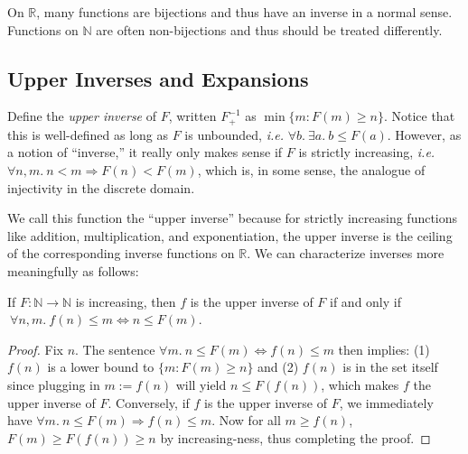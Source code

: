 On $\mathbb{R}$, many functions are bijections and thus have an inverse in a normal sense.  Functions on $\mathbb{N}$ are often non-bijections and thus should be treated differently.

\subsection{Upper Inverses and Expansions}
\begin{defn} \label{defn: inverse}
Define the \emph{upper inverse} of $F$, written $F^{-1}_{+}$ as $\min\{m : F(m)\ge n\}$.
Notice that this is well-defined as long as $F$ is unbounded, \emph{i.e.} $\forall b.~\exists a.~ b \leq F(a)$.  However, as a notion of ``inverse,'' it really only makes sense if $F$ is strictly
increasing, \emph{i.e.} $\forall n,m.~n < m \Rightarrow F(n) < F(m)$, which is, in some sense, the analogue of injectivity in the discrete domain.
\end{defn}
We call this function the ``upper inverse'' because for strictly increasing functions like
addition, multiplication, and exponentiation, the upper inverse is the ceiling of the 
corresponding inverse functions on $\mathbb{R}$. We can characterize inverses more meaningfully as follows: 
\begin{thm} \label{thm: upp-inverse-rel}
	If $F:\mathbb{N}\to \mathbb{N}$ is increasing, then $f$ is the upper inverse of $F$ if and only if $\ \forall n, m.~ f(n)\le m \iff n \le F(m)$.
\end{thm}
\begin{proof}
Fix $n$. The sentence $\forall m.~ n\le F(m) \iff f(n)\le m$ then implies: (1) $f(n)$ is a lower bound to $\{m: F(m)\ge n \}$ and (2) $f(n)$ is in the set itself since plugging in $m := f(n)$ will yield $n\le F(f(n))$, which makes $f$ the upper inverse of $F$. Conversely, if $f$ is the upper inverse of $F$, we immediately have $\forall m.~n\le F(m)\Rightarrow f(n)\le m$. Now for all $m \ge f(n)$, $F(m)\ge F(f(n)) \ge n$ by increasing-ness, thus completing the proof.
\end{proof}
